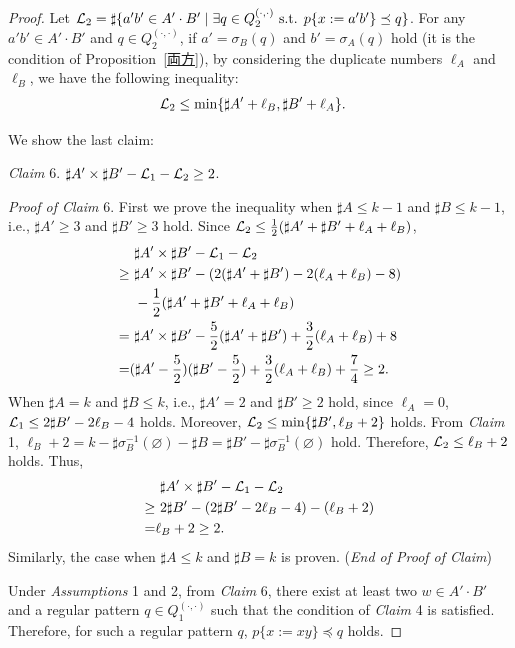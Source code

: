 \begin{proof}
\noindent
Let ${\cal L}_{2} = \sharp\{a'b' \in A'\cdot B' \mid \exists q \in Q_{2}^{(\cdot,\cdot)} \mbox{ s.t. } p\{x:=a'b'\} \preceq q\}$.
For any $a'b' \in A'\cdot B'$ and $q \in Q_{2}^{(\cdot,\cdot)}$, if $a' = \sigma_{B}(q)$ and $b' = \sigma_{A}(q)$ hold (it is the condition of Proposition~\ref{両方}), by considering the duplicate numbers $\ell_{A}$ and $\ell_{B}$, we have the following inequality:
\begin{align*}
  {\cal L}_{2} &\leq \min\{\sharp A' + \ell_{B}, \sharp B' + \ell_{A}\}.
\end{align*}

We show the last claim:
  
\smallskip

\noindent
\textit{Claim} 6. 
$\sharp A' \times \sharp B' - {\cal L}_{1} - {\cal L}_{2} \geq 2$.

\smallskip

\noindent
\textit{Proof of Claim} 6. 
First we prove the inequality when $\sharp A \leq k - 1$ and $\sharp B \leq k - 1$, i.e., $\sharp A' \geq 3$ and $\sharp B' \geq 3$ hold.
Since ${\cal L}_{2} \leq \frac{1}{2}(\sharp A' + \sharp B' + \ell_{A} + \ell_{B})$,
\begin{align*}
  &\ \sharp A' \times \sharp B' - {\cal L}_{1} - {\cal L}_{2}\\
\geq &\ \sharp A' \times \sharp B' - (2(\sharp A' + \sharp B') - 2(\ell_{A} + \ell_{B}) - 8)\\
  &\ - \frac{1}{2}(\sharp A' + \sharp B' + \ell_{A} + \ell_{B})\\
=    &\ \sharp A' \times \sharp B' - \frac{5}{2}(\sharp A' + \sharp B') + \frac{3}{2}(\ell_{A} + \ell_{B}) + 8\\
=    &(\sharp A' - \frac{5}{2})(\sharp B' - \frac{5}{2}) + \frac{3}{2}(\ell_{A} + \ell_{B}) + \frac{7}{4} \geq 2.
\end{align*}
When $\sharp A = k$ and $\sharp B \leq k$, i.e., $\sharp A' = 2$ and $\sharp B' \geq 2$ hold, since $\ell_{A} = 0$,
${\cal L}_{1} \leq 2\sharp B' - 2\ell_{B} -4$ holds.
Moreover, ${\cal L}_{2} \leq \min\{\sharp B', \ell_{B} + 2\}$ holds.
From \textit{Claim} 1, $\ell_B + 2 = k - \sharp\sigma^{-1}_{B}(\varnothing) - \sharp B = \sharp B' - \sharp\sigma^{-1}_{B}(\varnothing)$ hold. Therefore, ${\cal L}_{2} \leq \ell_{B} + 2$ holds.
Thus,
\begin{align*}
  &\ \sharp A' \times \sharp B' - {\cal L}_{1} - {\cal L}_{2}\\
\geq &\ 2\sharp B' - (2\sharp B' - 2\ell_{B} -4) - (\ell_{B} + 2)\\
= & \ell_B + 2 \geq 2.
\end{align*}
Similarly, the case when $\sharp A \leq k$ and $\sharp B = k$ is proven.
(\textit{End of Proof of Claim})

\smallskip

Under \textit{Assumptions} 1 and 2, from \textit{Claim} 6, there exist at least two $w\in A'\cdot B'$ and a regular pattern $q \in Q_{1}^{(\cdot,\cdot)}$ such that the condition of \textit{Claim} 4 is satisfied. 
Therefore, for such a regular pattern $q$, $p \{x := xy\} \preceq q$ holds.
\end{proof}

